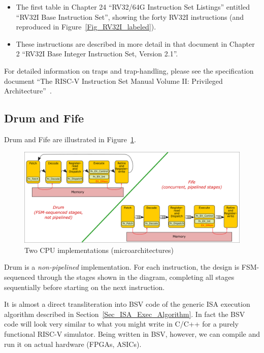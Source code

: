 \begin{itemize}

 \item The first table in Chapter 24 ``RV32/64G Instruction Set
       Listings'' entitled ``RV32I Base Instruction Set'', showing the
       forty RV32I instructions (and reproduced in
       Figure~\ref{Fig_RV32I_labeled}).

 \item These instructions are described in more detail in that
       document in Chapter 2 ``RV32I Base Integer Instruction Set,
       Version 2.1''.

\end{itemize}

For detailed information on traps and trap-handling, please see the
specification document ``The RISC-V Instruction Set Manual Volume II:
Privileged Architecture''~\cite{RISCV_Priv_2021_12_03}.


\subsection{Drum and Fife}

Drum and Fife are illustrated in Figure~\ref{Fig_Two_Microarchitectures}.
\begin{figure}[htbp]
  \centerline{\includegraphics[width=6in,angle=0]{Figures/Fig_Two_Microarchitectures}}
  \caption{\label{Fig_Two_Microarchitectures}Two CPU implementations (microarchitectures)}
\end{figure}

Drum is a \emph{non-pipelined} implementation.  For each instruction,
the design is FSM-sequenced through the stages shown in the diagram,
completing all stages sequentially before starting on the next
instruction.

It is almost a direct transliteration into BSV code of the generic ISA
execution algorithm described in Section~\ref{Sec_ISA_Exec_Algorithm}.
In fact the BSV code will look very similar to what you might write in
C/C++ for a purely functional RISC-V simulator.  Being written in BSV,
however, we can compile and run it on actual hardware (FPGAs, ASICs).
       
